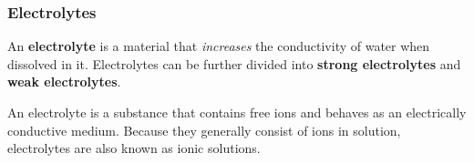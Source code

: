             \subsubsection{ Electrolytes}
            \nopagebreak
        \label{m38720*id338650}An \textbf{electrolyte} is a material that \textsl{increases} the conductivity of water when dissolved in it. Electrolytes can be further divided into \textbf{strong electrolytes} and \textbf{weak electrolytes}.\par 
\label{m38720*fhsst!!!underscore!!!id641}
 { \label{m38720*meaningfhsst!!!underscore!!!id641}
        An electrolyte is a substance that contains free ions and behaves as an electrically conductive medium. Because they generally consist of ions in solution, electrolytes are also known as ionic solutions. 
         } 
